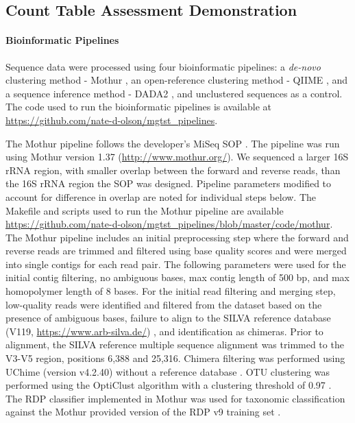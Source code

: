 \documentclass[linenumbers]{bmcart}
\begin{document}
\subsection*{Count Table Assessment Demonstration}
\paragraph*{Bioinformatic Pipelines}

Sequence data were processed using four bioinformatic pipelines: a
\emph{de-novo} clustering method - Mothur
\cite{schloss2009introducing}, an open-reference clustering method -
QIIME \cite{Caporaso2010}, and a sequence inference method - DADA2
\cite{callahan2016dada2}, and unclustered sequences as a control. The
code used to run the bioinformatic pipelines is available at
\url{https://github.com/nate-d-olson/mgtst_pipelines}.

The Mothur pipeline follows the developer's MiSeq SOP
\cite{schloss2009introducing, kozich2013development}. The pipeline was
run using Mothur version 1.37 (\url{http://www.mothur.org/}). We
sequenced a larger 16S rRNA region, with smaller overlap between the
forward and reverse reads, than the 16S rRNA region the SOP was
designed. Pipeline parameters modified to account for difference in
overlap are noted for individual steps below. The Makefile and scripts
used to run the Mothur pipeline are available
\url{https://github.com/nate-d-olson/mgtst_pipelines/blob/master/code/mothur}.
The Mothur pipeline includes an initial preprocessing step where the
forward and reverse reads are trimmed and filtered using base quality
scores and were merged into single contigs for each read pair. The
following parameters were used for the initial contig filtering, no
ambiguous bases, max contig length of 500 bp, and max homopolymer length
of 8 bases. For the initial read filtering and merging step, low-quality
reads were identified and filtered from the dataset based on the
presence of ambiguous bases, failure to align to the SILVA reference
database (V119, \url{https://www.arb-silva.de/}) \cite{quast2012silva},
and identification as chimeras. Prior to alignment, the SILVA reference
multiple sequence alignment was trimmed to the V3-V5 region, positions
6,388 and 25,316. Chimera filtering was performed using UChime (version
v4.2.40) without a reference database \cite{edgar2011uchime}. OTU
clustering was performed using the OptiClust algorithm with a clustering
threshold of 0.97 \cite{westcott2017opticlust}. The RDP classifier
implemented in Mothur was used for taxonomic classification against the
Mothur provided version of the RDP v9 training set
\cite{wang2007naive}.
\end{document}
